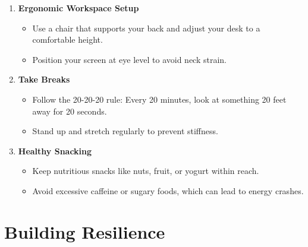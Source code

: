 \documentclass[
  letterpaper,
  DIV=11,
  numbers=noendperiod]{scrreprt}
\providecommand{\tightlist}{%
  \setlength{\itemsep}{0pt}\setlength{\parskip}{0pt}}\usepackage{longtable,booktabs,array}
\begin{document}
\begin{enumerate}
\def\labelenumi{\arabic{enumi}.}
\item
  \textbf{Ergonomic Workspace Setup}

  \begin{itemize}
  \tightlist
  \item
    Use a chair that supports your back and adjust your desk to a
    comfortable height.
  \item
    Position your screen at eye level to avoid neck strain.
  \end{itemize}
\item
  \textbf{Take Breaks}

  \begin{itemize}
  \tightlist
  \item
    Follow the 20-20-20 rule: Every 20 minutes, look at something 20
    feet away for 20 seconds.
  \item
    Stand up and stretch regularly to prevent stiffness.
  \end{itemize}
\item
  \textbf{Healthy Snacking}

  \begin{itemize}
  \tightlist
  \item
    Keep nutritious snacks like nuts, fruit, or yogurt within reach.
  \item
    Avoid excessive caffeine or sugary foods, which can lead to energy
    crashes.
  \end{itemize}
\end{enumerate}

\section{Building Resilience}\label{building-resilience}
\end{document}

